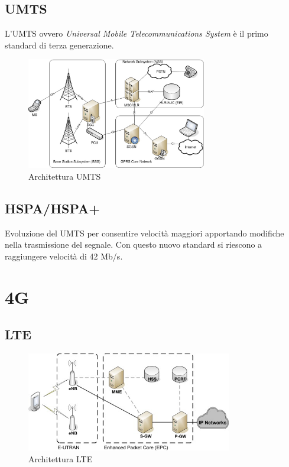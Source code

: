 \subsection{UMTS}
L'UMTS ovvero \textit{Universal Mobile Telecommunications System}\cite{umts} è il primo standard di terza generazione.
\begin{figure}[ht]
    \centering
    \includegraphics[width=0.7\textwidth]{images/3g-umts.png}
    \caption{Architettura UMTS}
\end{figure}


\subsection{HSPA/HSPA+}
Evoluzione del UMTS per consentire velocità maggiori apportando modifiche nella trasmissione del segnale.
Con questo nuovo standard si riescono a raggiungere velocità di 42 Mb/s\cite{hspa}.

\clearpage

\section{4G}
\cite{lte}
\subsection{LTE}
\begin{figure}[ht]
    \centering
    \includegraphics[width=0.8\textwidth]{images/4g-lte.jpg}
    \caption{Architettura LTE}
\end{figure}

